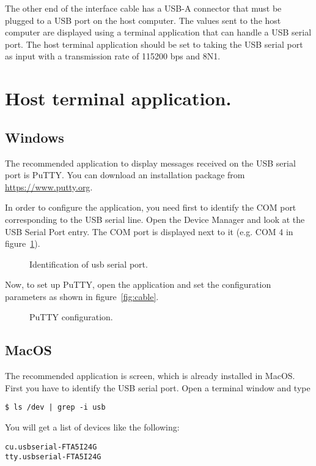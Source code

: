 The other end of the interface cable has a USB-A connector that must be plugged to a USB port on the host computer. The values sent to the host computer are displayed using a terminal application that can handle a USB serial port. The host terminal application should be set to taking the USB serial port as input with a transmission rate of 115200 bps and 8N1.

\section{Host terminal application.}\label{sc:term}
\subsection{Windows}

The recommended application to display messages received on the USB serial port is PuTTY. You can download an installation package from \url{https://www.putty.org}.

In order to configure the application, you need first to identify the COM port corresponding to the USB serial line. Open the Device Manager and look at the USB Serial Port entry. The COM port is displayed next to it (e.g. COM 4 in figure~\ref{fig:com}).

\begin{figure}[h]
            \caption{Identification of usb serial port.}
            \label{fig:com}
\end{figure}

Now, to set up PuTTY, open the application and set the configuration parameters as shown in figure~\ref{fig:cable}.

\begin{figure}[h]
            \caption{PuTTY configuration.}
            \label{fig:putty}
\end{figure}

\subsection{MacOS}
The recommended application is screen, which is already installed in MacOS.
First you have to identify the USB serial port. Open a terminal window and type
\begin{verbatim}
$ ls /dev | grep -i usb
\end{verbatim}
You will get a list of devices like the following:
\begin{verbatim}
cu.usbserial-FTA5I24G
tty.usbserial-FTA5I24G
\end{verbatim}

